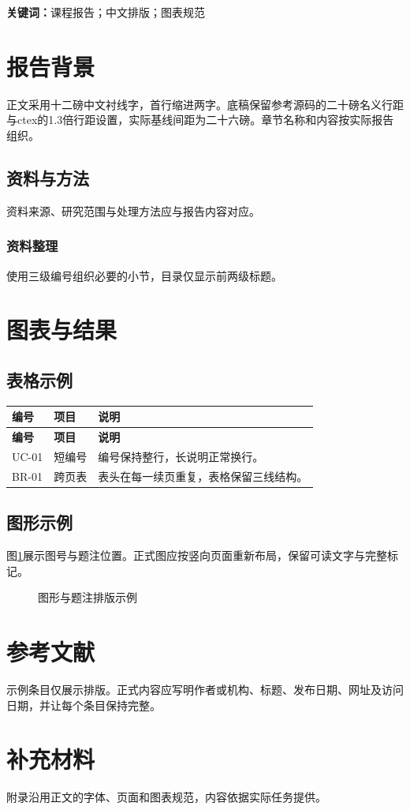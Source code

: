 \documentclass[UTF8,12pt,a4paper,fontset=none]{ctexart}
\newcommand{\ReportCode}[1]{\mbox{#1}}
\begin{document}
\textbf{关键词：}课程报告；中文排版；图表规范

\section{报告背景}
正文采用十二磅中文衬线字，首行缩进两字。底稿保留参考源码的二十磅名义行距与ctex的1.3倍行距设置，实际基线间距为二十六磅。章节名称和内容按实际报告组织。
\subsection{资料与方法}
资料来源、研究范围与处理方法应与报告内容对应。
\subsubsection{资料整理}
使用三级编号组织必要的小节，目录仅显示前两级标题。

\section{图表与结果}
\subsection{表格示例}
\begin{longtable}{@{}p{}p{}p{}@{}}
\toprule
\textbf{编号} & \textbf{项目} & \textbf{说明}\\
\midrule
\endfirsthead
\toprule
\textbf{编号} & \textbf{项目} & \textbf{说明}\\
\midrule
\endhead
\bottomrule
\endlastfoot
\ReportCode{UC-01} & 短编号 & 编号保持整行，长说明正常换行。\\
\ReportCode{BR-01} & 跨页表 & 表头在每一续页重复，表格保留三线结构。\\
\end{longtable}

\subsection{图形示例}
图\ref{fig:layout-demo}展示图号与题注位置。正式图应按竖向页面重新布局，保留可读文字与完整标记。
\begin{figure}[htbp]
\centering
{}
\caption{图形与题注排版示例}
\label{fig:layout-demo}
\end{figure}

\section*{参考文献}
{}
\noindent 示例条目仅展示排版。正式内容应写明作者或机构、标题、发布日期、网址及访问日期，并让每个条目保持完整。

\appendix
\section{补充材料}
附录沿用正文的字体、页面和图表规范，内容依据实际任务提供。
\end{document}

